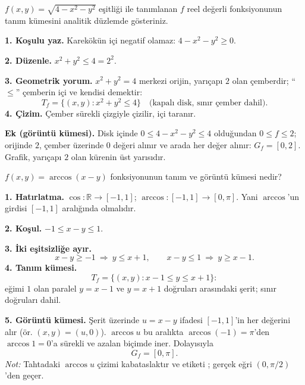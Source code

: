\begin{soru}
$f(x,y)=\sqrt{4-x^2-y^2}$ eşitliği ile tanımlanan $f$ reel değerli fonksiyonunun tanım kümesini analitik düzlemde
gösteriniz.
\end{soru}
\begin{cevap}
\textbf{1. Koşulu yaz.} Karekökün içi negatif olamaz: $4-x^2-y^2\ge0$.

\textbf{2. Düzenle.} $x^2+y^2\le4=2^2$.

\textbf{3. Geometrik yorum.} $x^2+y^2=4$ merkezi orijin, yarıçapı $2$ olan çemberdir; ``$\le$'' çemberin içi ve kendisi
demektir:
\[
T_f=\{(x,y): x^2+y^2\le4\}\quad\text{(kapalı disk, sınır çember dahil)}.
\]
\textbf{4. Çizim.} Çember sürekli çizgiyle çizilir, içi taranır.

\textbf{Ek (görüntü kümesi).} Disk içinde $0\le4-x^2-y^2\le4$ olduğundan $0\le f\le2$; orijinde $2$, çember üzerinde
$0$ değeri alınır ve arada her değer alınır: $G_f=[0,2]$. Grafik, yarıçapı $2$ olan kürenin üst yarısıdır.
\end{cevap}

\begin{soru}
$f(x,y)=\arccos(x-y)$ fonksiyonunun tanım ve görüntü kümesi nedir?
\end{soru}
\begin{cevap}
\textbf{1. Hatırlatma.} $\cos:\mathbb R\to[-1,1]$; $\arccos:[-1,1]\to[0,\pi]$. Yani $\arccos$'un girdisi $[-1,1]$
aralığında olmalıdır.

\textbf{2. Koşul.} $-1\le x-y\le1$.

\textbf{3. İki eşitsizliğe ayır.}
\[
x-y\ge-1\ \Rightarrow\ y\le x+1, \qquad x-y\le1\ \Rightarrow\ y\ge x-1 .
\]
\textbf{4. Tanım kümesi.}
\[
T_f=\{(x,y): x-1\le y\le x+1\}:
\]
eğimi $1$ olan paralel $y=x-1$ ve $y=x+1$ doğruları arasındaki şerit; sınır doğruları dahil.

\textbf{5. Görüntü kümesi.} Şerit üzerinde $u=x-y$ ifadesi $[-1,1]$'in her değerini alır (ör. $(x,y)=(u,0)$).
$\arccos u$ bu aralıkta $\arccos(-1)=\pi$'den $\arccos1=0$'a sürekli ve azalan biçimde iner. Dolayısıyla
\[
G_f=[0,\pi].
\]
\emph{Not:} Tahtadaki $\arccos u$ çizimi kabataslaktır ve etiketi ; gerçek eğri $(0,\pi/2)$'den geçer.
\end{cevap}


